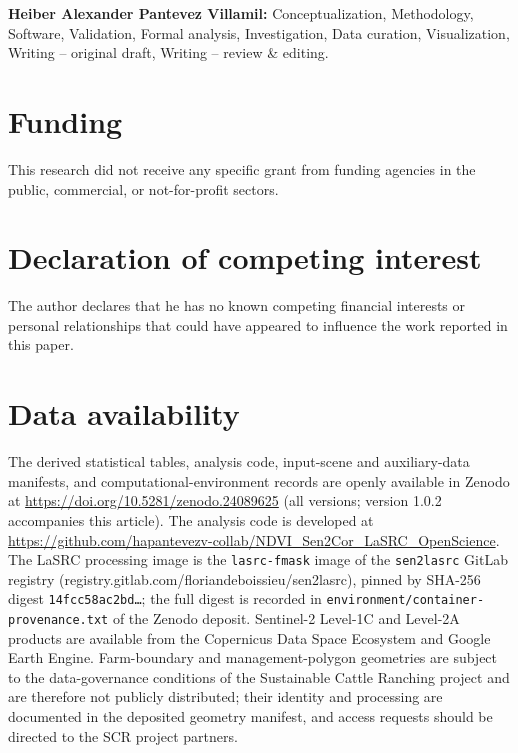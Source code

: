 \documentclass[
  authoryear,
  preprint]{elsarticle}
\begin{document}
\textbf{Heiber Alexander Pantevez Villamil:} Conceptualization,
Methodology, Software, Validation, Formal analysis, Investigation, Data
curation, Visualization, Writing -- original draft, Writing -- review \&
editing.

\section*{Funding}\label{funding}

This research did not receive any specific grant from funding agencies
in the public, commercial, or not-for-profit sectors.

\section*{Declaration of competing
interest}\label{declaration-of-competing-interest}

The author declares that he has no known competing financial interests
or personal relationships that could have appeared to influence the work
reported in this paper.

\section*{Data availability}\label{data-availability}

The derived statistical tables, analysis code, input-scene and
auxiliary-data manifests, and computational-environment records are
openly available in Zenodo at
\url{https://doi.org/10.5281/zenodo.24089625} (all versions; version
1.0.2 accompanies this article). The analysis code is developed at
\url{https://github.com/hapantevezv-collab/NDVI_Sen2Cor_LaSRC_OpenScience}.
The LaSRC processing image is the \texttt{lasrc-fmask} image of the
\texttt{sen2lasrc} GitLab registry
(registry.gitlab.com/floriandeboissieu/sen2lasrc), pinned by SHA-256
digest \texttt{14fcc58ac2bd…}; the full digest is recorded in
\texttt{environment/container-provenance.txt} of the Zenodo deposit.
Sentinel-2 Level-1C and Level-2A products are available from the
Copernicus Data Space Ecosystem and Google Earth Engine. Farm-boundary
and management-polygon geometries are subject to the data-governance
conditions of the Sustainable Cattle Ranching project and are therefore
not publicly distributed; their identity and processing are documented
in the deposited geometry manifest, and access requests should be
directed to the SCR project partners.
\end{document}

